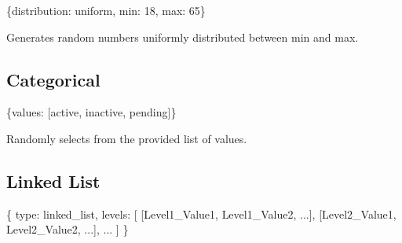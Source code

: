 \documentclass[
  letterpaper,
]{scrbook}
\newenvironment{Shaded}{\begin{snugshade}}{\end{snugshade}}
\newcommand{\DecValTok}[1]{\textcolor[rgb]{0.68,0.00,0.00}{#1}}
\newcommand{\NormalTok}[1]{\textcolor[rgb]{0.00,0.23,0.31}{#1}}
\newcommand{\StringTok}[1]{\textcolor[rgb]{0.13,0.47,0.30}{#1}}
\begin{document}
\begin{Shaded}
\begin{Highlighting}[]
\NormalTok{\{}\StringTok{\textquotesingle{}distribution\textquotesingle{}}\NormalTok{: }\StringTok{\textquotesingle{}uniform\textquotesingle{}}\NormalTok{, }\StringTok{\textquotesingle{}min\textquotesingle{}}\NormalTok{: }\DecValTok{18}\NormalTok{, }\StringTok{\textquotesingle{}max\textquotesingle{}}\NormalTok{: }\DecValTok{65}\NormalTok{\}}
\end{Highlighting}
\end{Shaded}

Generates random numbers uniformly distributed between min and max.

\subsection{Categorical}\label{categorical}

\begin{Shaded}
\begin{Highlighting}[]
\NormalTok{\{}\StringTok{\textquotesingle{}values\textquotesingle{}}\NormalTok{: [}\StringTok{\textquotesingle{}active\textquotesingle{}}\NormalTok{, }\StringTok{\textquotesingle{}inactive\textquotesingle{}}\NormalTok{, }\StringTok{\textquotesingle{}pending\textquotesingle{}}\NormalTok{]\}}
\end{Highlighting}
\end{Shaded}

Randomly selects from the provided list of values.

\subsection{Linked List}\label{linked-list}

\begin{Shaded}
\begin{Highlighting}[]
\NormalTok{\{}
    \StringTok{\textquotesingle{}type\textquotesingle{}}\NormalTok{: }\StringTok{\textquotesingle{}linked\_list\textquotesingle{}}\NormalTok{,}
    \StringTok{\textquotesingle{}levels\textquotesingle{}}\NormalTok{: [}
\NormalTok{        [}\StringTok{\textquotesingle{}Level1\_Value1\textquotesingle{}}\NormalTok{, }\StringTok{\textquotesingle{}Level1\_Value2\textquotesingle{}}\NormalTok{, ...],}
\NormalTok{        [}\StringTok{\textquotesingle{}Level2\_Value1\textquotesingle{}}\NormalTok{, }\StringTok{\textquotesingle{}Level2\_Value2\textquotesingle{}}\NormalTok{, ...],}
\NormalTok{        ...}
\NormalTok{    ]}
\NormalTok{\}}
\end{Highlighting}
\end{Shaded}
\end{document}

